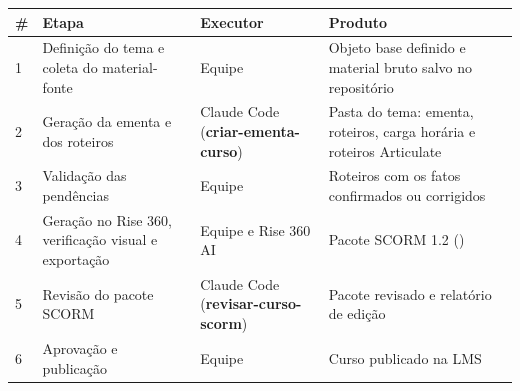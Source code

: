 \documentclass[12pt,a4paper]{article}
\newcommand{\skill}[1]{\textsf{\textbf{#1}}}
\begin{document}
\begingroup\small
\renewcommand{\arraystretch}{1.3}
\begin{longtable}{@{}C{0.05\textwidth}L{0.31\textwidth}L{0.17\textwidth}L{0.36\textwidth}@{}}
\toprule
\textbf{\#} & \textbf{Etapa} & \textbf{Executor} & \textbf{Produto} \\
\midrule
{} & Definição do tema e coleta do material-fonte & Equipe & Objeto base definido e material bruto salvo no repositório \\
2 & Geração da ementa e dos roteiros & Claude Code (\skill{criar-ementa-curso}) & Pasta do tema: ementa, roteiros, carga horária e roteiros Articulate \\
3 & Validação das pendências & Equipe & Roteiros com os fatos confirmados ou corrigidos \\
4 & Geração no Rise 360, verificação visual e exportação & Equipe e Rise 360 AI & Pacote SCORM 1.2 () \\
5 & Revisão do pacote SCORM & Claude Code (\skill{revisar-curso-scorm}) & Pacote revisado e relatório de edição \\
6 & Aprovação e publicação & Equipe & Curso publicado na LMS \\
\bottomrule
\end{longtable}
\endgroup
\end{document}
